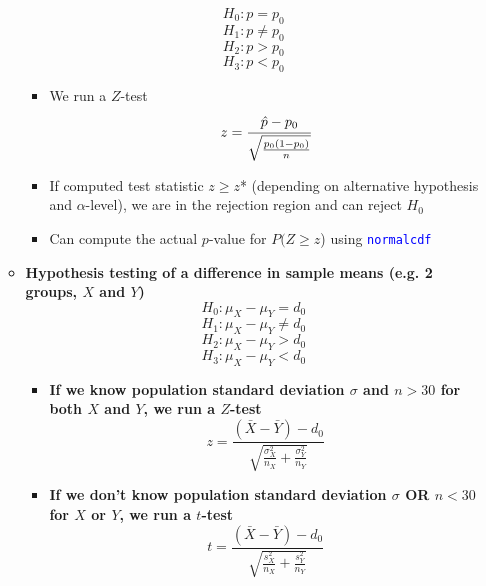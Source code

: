 \documentclass{article}
\begin{document}
\begin{itemize}
\begin{itemize}
\begin{equation*}
	H_0: p=p_0	
	\end{equation*}
	\begin{equation*}
	H_1: p \neq p_0
	\end{equation*}
	\begin{equation*}
	H_2: p > p_0
	\end{equation*}
	\begin{equation*}
	H_3: p < p_0	
	\end{equation*}
	\begin{itemize}
		\item We run a $Z$-test 
				\begin{equation*}
		z = \cfrac{\hat{p}-p_0}{\sqrt{\frac{p_0(1-p_0)}{n}}}
		\end{equation*}
		\item If computed test statistic $z \geq z$* (depending on alternative hypothesis and $\alpha$-level), we are in the rejection region and can reject $H_0$
		\item Can compute the actual $p$-value for $P(Z \geq z$) using \textcolor{blue}{\texttt{normalcdf}}
	\end{itemize}
	\item \textbf{Hypothesis testing of a difference in sample means (e.g. 2 groups, $X$ and $Y$)}
		\begin{equation*}
	H_0: \mu_X-\mu_Y=d_0	
	\end{equation*}
	\begin{equation*}
	H_1: \mu_X -\mu_Y\neq d_0
	\end{equation*}
	\begin{equation*}
	H_2: \mu_X -\mu_Y > d_0
	\end{equation*}
	\begin{equation*}
	H_3: \mu_X -\mu_Y < d_0
	\end{equation*}
	\begin{itemize}
		\item \textbf{If we know population standard deviation $\sigma$ and $n>30$ for both $X$ and $Y$, we run a $Z$-test}
						\begin{equation*}
	z = \frac{(\bar{X}-\bar{Y})-d_0}{\sqrt{\frac{\sigma_X^2}{n_X}+\frac{\sigma_Y^2}{n_Y}}}
						\end{equation*}
		\item \textbf{If we don't know population standard deviation $\sigma$ OR $n<30$ for $X$ or $Y$, we run a $t$-test}
						\begin{equation*}
	t = \frac{(\bar{X}-\bar{Y})-d_0}{\sqrt{\frac{s_X^2}{n_X}+\frac{s_Y^2}{n_Y}}}
						\end{equation*}

\end{itemize}
\end{itemize}
\end{itemize}
\end{document}
